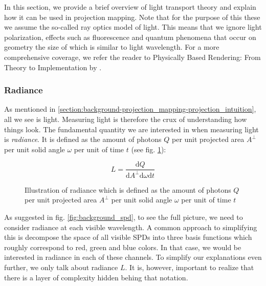In this section, we provide a brief overview of light transport theory and explain how it can be used in projection mapping. Note that for the purpose of this these we assume the so-called ray optics model of light. This means that we ignore light polarization, effects such as fluorescence and quantum phenomena that occur on geometry the size of which is similar to light wavelength. For a more comprehensive coverage, we refer the reader to Physically Based Rendering: From Theory to Implementation by \citet{PBRT3e}.

\subsubsection{Radiance}
\label{section:background-projection_mapping-light_transport-radiance}

As mentioned in \ref{section:background-projection_mapping-projection_intuition}, all we see is light. Measuring light is therefore the crux of understanding how things look. The fundamental quantity we are interested in when measuring light is \textit{radiance}. It is defined as the amount of photons \(Q\) per unit projected area \(A^\perp \) per unit solid angle \(\omega\) per unit of time \(t\) (see fig. \ref{fig:background_radiance}):

\begin{equation}
    \label{eq:radiance}
    L = \frac{\mathrm{d}Q}{\mathrm{d}A^\perp \mathrm{d}\omega \mathrm{d}t}
\end{equation}

\begin{figure}[ht]
    \centering
    \def\svgwidth{0.8\textwidth}
    
    \caption{Illustration of radiance which is defined as the amount of photons \(Q\) per unit projected area \(A^\perp \) per unit solid angle \(\omega\) per unit of time \(t\)}
    \label{fig:background_radiance}
\end{figure}

As suggested in fig. \ref{fig:background_spd}, to see the full picture, we need to consider radiance at each visible wavelength. A common approach to simplifying this is decompose the space of all visible SPDs into three basis functions which roughly correspond to red, green and blue colors. In that case, we would be interested in radiance in each of these channels. To simplify our explanations even further, we only talk about radiance \(L\). It is, however, important to realize that there is a layer of complexity hidden behing that notation.


